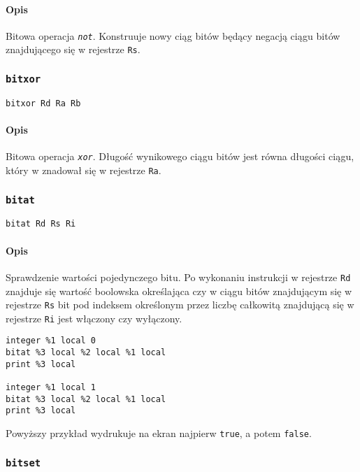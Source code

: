 \paragraph*{Opis} Bitowa operacja \emph{\texttt{not}}.
Konstruuje nowy ciąg bitów będący negacją ciągu bitów znajdującego się w
rejestrze \texttt{Rs}.

\subsubsection{\texttt{bitxor}}

\begin{lstlisting}
bitxor Rd Ra Rb
\end{lstlisting}

\paragraph*{Opis} Bitowa operacja \emph{\texttt{xor}}.
Długość wynikowego ciągu bitów jest równa długości ciągu, który w znadował się w
rejestrze \texttt{Ra}.

\subsubsection{\texttt{bitat}}

\begin{lstlisting}
bitat Rd Rs Ri
\end{lstlisting}

\paragraph*{Opis} Sprawdzenie wartości pojedynczego bitu.
Po wykonaniu instrukcji w rejestrze \texttt{Rd} znajduje się wartość boolowska
określająca czy w ciągu bitów znajdującym się w rejestrze \texttt{Rs} bit pod
indeksem określonym przez liczbę całkowitą znajdującą się w rejestrze
\texttt{Ri} jest włączony czy wyłączony.

\begin{lstlisting}
integer %1 local 0
bitat %3 local %2 local %1 local
print %3 local

integer %1 local 1
bitat %3 local %2 local %1 local
print %3 local
\end{lstlisting}
Powyższy przykład wydrukuje na ekran najpierw \texttt{true}, a potem
\texttt{false}.

\subsubsection{\texttt{bitset}}


